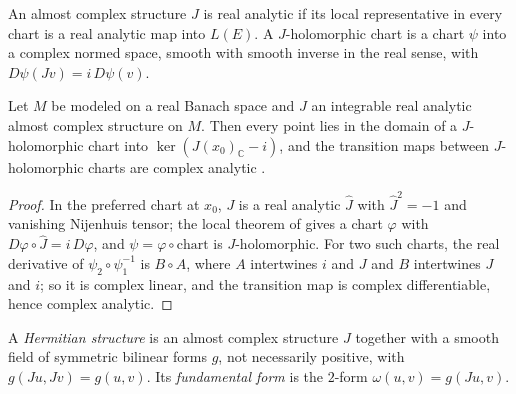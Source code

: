 \begin{definition}
  \label{def:holomorphic-chart}
  \leanok
  An almost complex structure $J$ is real analytic if its local representative in every chart is
  a real analytic map into $L(E)$. A $J$-holomorphic chart is a chart $\psi$ into a complex normed
  space, smooth with smooth inverse in the real sense, with $D\psi(J v) = i\, D\psi(v)$.
\end{definition}

\begin{theorem}
  \label{thm:nn-manifold}
  \leanok
  Let $M$ be modeled on a real Banach space and $J$ an integrable real analytic almost complex
  structure on $M$. Then every point lies in the domain of a $J$-holomorphic chart into
  $\ker(J(x_0)_{\mathbb{C}} - i)$, and the transition maps between $J$-holomorphic charts are
  complex analytic \cite[Th\'eor\`eme 3.5]{Pen70}.
\end{theorem}

\begin{proof}
  \leanok
  In the preferred chart at $x_0$, $J$ is a real analytic $\hat J$ with $\hat J^2 = -1$ and
  vanishing Nijenhuis tensor; the local theorem of \cite{LCA} gives a chart $\varphi$ with
  $D\varphi \circ \hat J = i\,D\varphi$, and $\psi = \varphi \circ \mathrm{chart}$ is
  $J$-holomorphic. For two such charts, the real derivative of $\psi_2 \circ \psi_1^{-1}$ is
  $B \circ A$, where $A$ intertwines $i$ and $J$ and $B$ intertwines $J$ and $i$; so it is complex
  linear, and the transition map is complex differentiable, hence complex analytic.
\end{proof}

\begin{definition}
  \label{def:hermitian}
  \leanok
  A \emph{Hermitian structure} is an almost complex structure $J$ together with a smooth field of
  symmetric bilinear forms $g$, not necessarily positive, with $g(Ju, Jv) = g(u, v)$. Its
  \emph{fundamental form} is the $2$-form $\omega(u, v) = g(Ju, v)$.
\end{definition}

